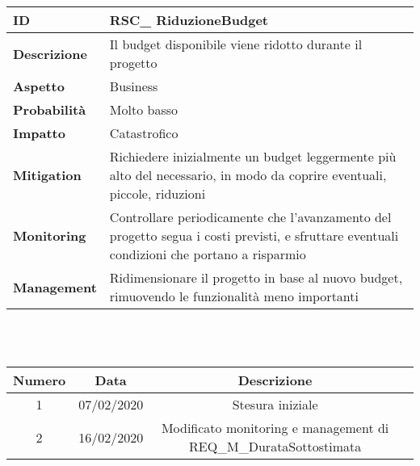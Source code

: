 \begin{tabular}{|p{2.2cm}|p{9.6cm}| }
 	\hline
	\textbf{ID} & RSC\_ RiduzioneBudget\\ [0.5ex] 
	\hline
	\textbf{Descrizione} & Il budget disponibile viene ridotto durante il progetto\\ 
	\hline
	\textbf{Aspetto} &  Business\\
	\hline
	\textbf{Probabilità} & Molto basso\\ 
	\hline
	\textbf{Impatto} & Catastrofico\\
	\hline
	\textbf{Mitigation} & Richiedere inizialmente un budget leggermente più alto del necessario, in modo da coprire eventuali, piccole, riduzioni\\
	\hline
	\textbf{Monitoring} & Controllare periodicamente che l'avanzamento del progetto segua i costi previsti, e sfruttare eventuali condizioni che portano a risparmio\\ 
	\hline
	\textbf{Management} & Ridimensionare il progetto in base al nuovo budget, rimuovendo le funzionalità meno importanti\\ 
	\hline
\end{tabular}

\renewcommand\theadfont{}

\newpage
{} \\ \\
\begin{tabular}{|c | c | c | c|} 
 	\hline
	 Numero & Data & Descrizione \\ [0.5ex] 
	\hline\hline
	1 & 07/02/2020 & Stesura iniziale \\ 
	\hline
	2 & 16/02/2020 & Modificato monitoring e management di REQ\_M\_DurataSottostimata \\
	\hline
\end{tabular}